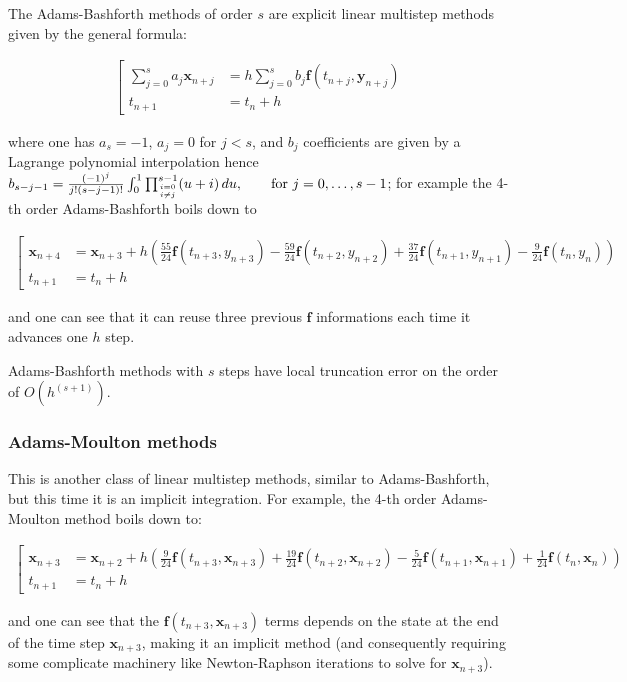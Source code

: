 \documentclass{digitaldynamics}
\def\vect#1{\bm{#1}}
\begin{document}
The Adams-Bashforth methods of order $s$ are explicit linear multistep methods given by the general formula:
\begin{fleqn}
\begin{align}
\left[
\begin{aligned}
\sum_{j=0}^s a_j \vect{x}_{n+j} &= h\sum_{j=0}^s b_j \vect{f}(t_{n+j},\vect{y}_{n+j}) \\
t_{n+1} &= t_n + h 
\end{aligned}
\right.
\end{align}
\end{fleqn}
where one has $a_s=-1$, $a_j=0$ for $j<s$, and $b_j$ coefficients are given by a Lagrange polynomial interpolation hence $b_{s-j-1} = \frac{(-1)^j}{j!(s-j-1)!} \int_0^1 \prod_{i=0 \atop i\ne j}^{s-1} (u+i) \,du, \qquad \text{for } j=0,\ldots,s-1$; for example the 4-th order Adams-Bashforth boils down to 
\begin{fleqn}
\begin{align}
\left[
\begin{aligned}
\vect{x}_{n+4} &= \vect{x}_{n+3} + h\left( \frac{55}{24} \vect{f}(t_{n+3}, y_{n+3}) - \frac{59}{24} \vect{f}(t_{n+2}, y_{n+2}) + \frac{37}{24} \vect{f}(t_{n+1}, y_{n+1}) - \frac{9}{24} \vect{f}(t_n, y_n) \right) \\
t_{n+1} &= t_n + h 
\end{aligned}
\right.
\end{align}
\end{fleqn}
and one can see that it can reuse three previous $\vect{f}$ informations each time it advances one $h$ step.

Adams-Bashforth methods with $s$ steps have local truncation error on the order of $O ( h^{(s+1)} )$.






\subsubsection{Adams-Moulton methods}

This is another class of linear multistep methods, similar to Adams-Bashforth, but this time it is an implicit integration.
For example, the 4-th order Adams-Moulton method boils down to:
\begin{fleqn}
\begin{align}
\left[
\begin{aligned}
\vect{x}_{n+3} &= \vect{x}_{n+2} + h \left( \frac{9}{24} \vect{f}(t_{n+3},\vect{x}_{n+3}) + \frac{19}{24} \vect{f}(t_{n+2},\vect{x}_{n+2}) - \frac{5}{24} \vect{f}(t_{n+1},\vect{x}_{n+1}) + \frac{1}{24} \vect{f}(t_n,\vect{x}_n) \right) \\
t_{n+1} &= t_n + h 
\end{aligned}
\right.
\end{align}
\end{fleqn}
and one can see that the $\vect{f}(t_{n+3},\vect{x}_{n+3})$ terms depends on the state at the end of the time step $\vect{x}_{n+3}$, making it an implicit method (and consequently requiring some complicate machinery like Newton-Raphson iterations to solve for $\vect{x}_{n+3}$).
\end{document}
